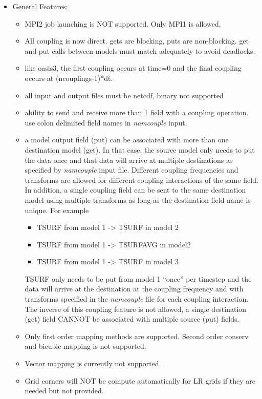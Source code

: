 \begin{itemize}

\item General Features:

\begin{itemize}
\item MPI2 job launching is NOT supported.  Only MPI1 is allowed.
\item All coupling is now direct.  gets are blocking, puts are 
  non-blocking.  get and put calls between models must match
  adequately to avoid deadlocks.
\item like oasis3, the first coupling occurs at time=0 and the
  final coupling occurs at (ncouplings-1)*dt.
\item all input and output files must be netcdf, binary not supported
\item ability to send and receive more than 1 field with a coupling
  operation.  use colon delimited field names in {\it namcouple} input.
\item a model output field (put) can be associated with more than one
  destination model (get).  In that case, the source model only
  needs to put the data once and that data will arrive at multiple
  destinations as specified by {\it namcouple} input file.  Different
  coupling frequencies and transforms are allowed for different
  coupling interactions of the same field.  In addition, a single
  coupling field can be sent to the same destination model using
  multiple transforms as long as the destination field name is
  unique.  For example
\begin{itemize}
\item    TSURF from model 1 -> TSURF in model 2
\item    TSURF from model 1 -> TSURFAVG in model2
\item    TSURF from model 1 -> TSURF in model 3 
\end{itemize}
  TSURF only needs to be put from model 1 ``once'' per timestep and
  the data will arrive at the destination at the coupling
  frequency and with transforms specified in the {\it namcouple} file
  for each coupling interaction.
  The inverse of this coupling feature is not allowed, a single
  destination (get) field CANNOT be associated with multiple source (put)
  fields.
\item Only first order mapping methods are supported.  Second order
  conserv and bicubic mapping is not supported.
\item Vector mapping is currently not supported.
\item Grid corners will NOT be compute automatically for LR grids if they are
  needed but not provided.
\end{itemize}


\end{itemize}
